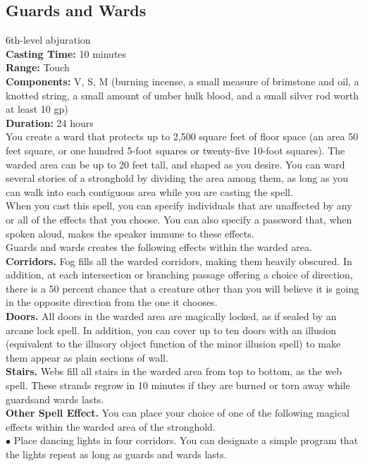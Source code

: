 \documentclass[11pt, A4paper, english]{article}
\begin{document}
		\subsection{Guards and Wards}
6th-level abjuration \\
\textbf{Casting Time:} 10 minutes \\
\textbf{Range:} Touch \\
\textbf{Components:} V, S, M (burning incense, a small measure of brimstone and oil, a knotted string, a small amount of umber hulk blood, and a small silver rod worth at least 10 gp) \\
\textbf{Duration:} 24 hours \\
You create a ward that protects up to 2,500 square feet of floor space (an area 50 feet square, or one hundred 5-foot squares or twenty-five 10-foot squares). The warded area can be up to 20 feet tall, and shaped as you desire. You can ward several stories of a stronghold by dividing the area among them, as long as you can walk into each contiguous area while you are casting the spell. \\
When you cast this spell, you can specify individuals that are unaffected by any or all of the effects that you choose. You can also specify a password that, when spoken aloud, makes the speaker immune to these effects. \\
Guards and wards creates the following effects within the warded area. \\
\textbf{Corridors.} Fog fills all the warded corridors, making them heavily obscured. In addition, at each intersection or branching passage offering a choice of direction, there is a 50 percent chance that a creature other than you will believe it is going in the opposite direction from the one it chooses. \\
\textbf{Doors.} All doors in the warded area are magically locked, as if sealed by an arcane lock spell. In addition, you can cover up to ten doors with an illusion (equivalent to the illusory object function of the minor illusion spell) to make them appear as plain sections of wall. \\
\textbf{Stairs.} Webs fill all stairs in the warded area from top to bottom, as the web spell. These strands regrow in 10 minutes if they are burned or torn away while guardsand wards lasts. \\
\textbf{Other Spell Effect.} You can place your choice of one of the following magical effects within the warded area of the stronghold. \\
$\bullet$ Place dancing lights in four corridors. You can designate a simple program that the lights repeat as long as guards and wards lasts. \\
\end{document}
